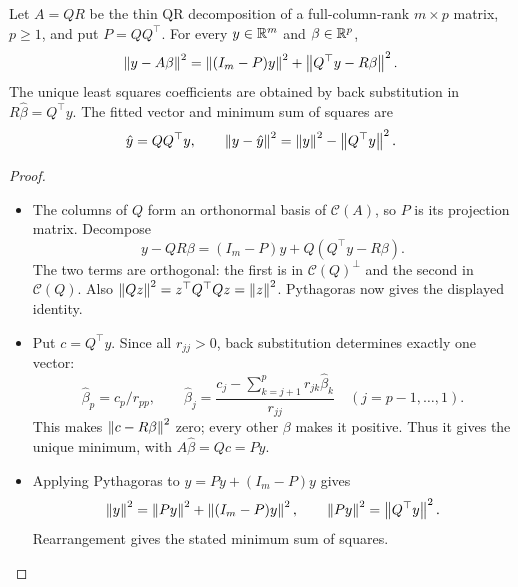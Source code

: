 \begin{proposition}\label{prop:06:qr-ls}
Let \(A=QR\) be the thin QR decomposition of a full-column-rank
\(m\times p\) matrix, \(p\geqslant1\), and put \(P=QQ^\top\).
For every \(y\in\mathbb R^m\) and \(\beta\in\mathbb R^p\),
\[
\left\lVert y-A\beta\right\rVert^2
=\left\lVert(I_m-P)y\right\rVert^2+\left\lVert Q^\top y-R\beta\right\rVert^2.
\]
The unique least squares coefficients are obtained by back substitution
in \(R\hat\beta=Q^\top y\). The fitted vector and minimum sum of squares are
\[
\hat y=QQ^\top y,\qquad
\left\lVert y-\hat y\right\rVert^2=\left\lVert y\right\rVert^2-\left\lVert Q^\top y\right\rVert^2.
\]
\end{proposition}
\begin{proof}
\begin{itemize}
\item The columns of \(Q\) form an orthonormal basis of
  \(\mathcal C(A)\), so \(P\) is its projection matrix. Decompose
  \[
  y-QR\beta=(I_m-P)y+Q(Q^\top y-R\beta).
  \]
  The two terms are orthogonal: the first is in
  \(\mathcal C(Q)^\perp\) and the second in \(\mathcal C(Q)\).
  Also \(\left\lVert Qz\right\rVert^2=z^\top Q^\top Qz=\left\lVert z\right\rVert^2\).
  Pythagoras now gives the displayed identity.
\item Put \(c=Q^\top y\). Since all \(r_{jj}>0\), back substitution
  determines exactly one vector:
  \[
  \hat\beta_p=c_p/r_{pp},\qquad
  \hat\beta_j=\frac{c_j-\sum_{k=j+1}^p r_{jk}\hat\beta_k}{r_{jj}}
  \quad(j=p-1,\ldots,1).
  \]
  This makes \(\left\lVert c-R\beta\right\rVert^2\) zero; every other \(\beta\)
  makes it positive. Thus it gives the unique minimum, with
  \(A\hat\beta=Qc=Py\).
\item Applying Pythagoras to \(y=Py+(I_m-P)y\) gives
  \[
  \left\lVert y\right\rVert^2=\left\lVert Py\right\rVert^2+\left\lVert(I_m-P)y\right\rVert^2,
  \qquad \left\lVert Py\right\rVert^2=\left\lVert Q^\top y\right\rVert^2.
  \]
  Rearrangement gives the stated minimum sum of squares.
\end{itemize}
\end{proof}

